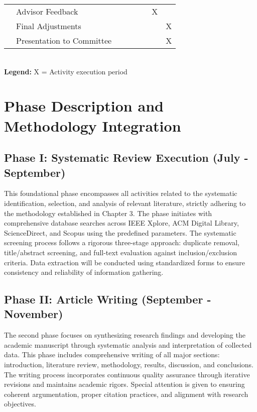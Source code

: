 \documentclass[twoside,brazilian,english]{UNISINOSmonografia}
\begin{document}
\begin{table}[htbp]
\begin{minipage}{\textwidth}
\begin{tabular}{|m{3.2cm}|m{4.3cm}|c|c|c|c|c|c|}
            \cline{2-8}
            & Advisor Feedback & & & & & X& \\
            \cline{2-8}
            & Final Adjustments & & & & & & X\\
            \cline{2-8}
            & Presentation to Committee & & & & & & X\\
            \hline
        \end{tabular}
        \\[0.5em]
        \textbf{Legend:} X  = Activity execution period\\
    \end{minipage}
\end{table}

\section{Phase Description and Methodology Integration}

\subsection{Phase I: Systematic Review Execution (July - September)}
This foundational phase encompasses all activities related to the systematic identification, selection, and analysis of relevant literature, strictly adhering to the methodology established in Chapter 3. The phase initiates with comprehensive database searches across IEEE Xplore, ACM Digital Library, ScienceDirect, and Scopus using the predefined parameters. The systematic screening process follows a rigorous three-stage approach: duplicate removal, title/abstract screening, and full-text evaluation against inclusion/exclusion criteria. Data extraction will be conducted using standardized forms to ensure consistency and reliability of information gathering.

\subsection{Phase II: Article Writing (September - November)}  
The second phase focuses on synthesizing research findings and developing the academic manuscript through systematic analysis and interpretation of collected data. This phase includes comprehensive writing of all major sections: introduction, literature review, methodology, results, discussion, and conclusions. The writing process incorporates continuous quality assurance through iterative revisions and maintains academic rigors. Special attention is given to ensuring coherent argumentation, proper citation practices, and alignment with research objectives.
\end{document}
